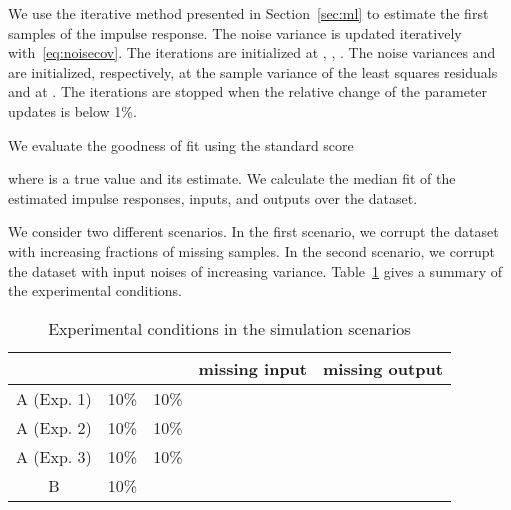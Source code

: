 \documentclass[10pt]{article}
\begin{document}
We use the iterative method presented in Section~\ref{sec:ml} to estimate the
first  samples of the impulse response. The noise variance is updated
iteratively with~\eqref{eq:noisecov}. The iterations are initialized at
, , . The noise variances
 and  are initialized, respectively, at the sample
variance
of the least squares residuals and at . The iterations
are stopped when the relative change of the parameter updates is below 1\%.

We evaluate the goodness of fit using the standard score

where  is a true value and  its estimate. We calculate
the median fit of the estimated impulse responses, inputs, and outputs over the
dataset.

We consider two different scenarios. In the first scenario, we corrupt the
dataset with increasing fractions of missing samples. In the second scenario, we
corrupt the dataset with input noises of increasing variance.
Table~\ref{tab:summary} gives a summary of the experimental conditions.

\begin{table}[b]
  \centering
  \begin{tabular}{ccccc}
    \toprule
    &  &  & missing input  & missing output\\
    \midrule
    A (Exp. 1) & 10\% & 10\% &   & \\
    A (Exp. 2) & 10\% & 10\% &  &  \\
    A (Exp. 3) & 10\% & 10\% &  & \\
    B & 10\% &  &  & \\
    \bottomrule
  \end{tabular}
  \caption{Experimental conditions in the simulation scenarios}\label{tab:summary}
\end{table}
\end{document}

